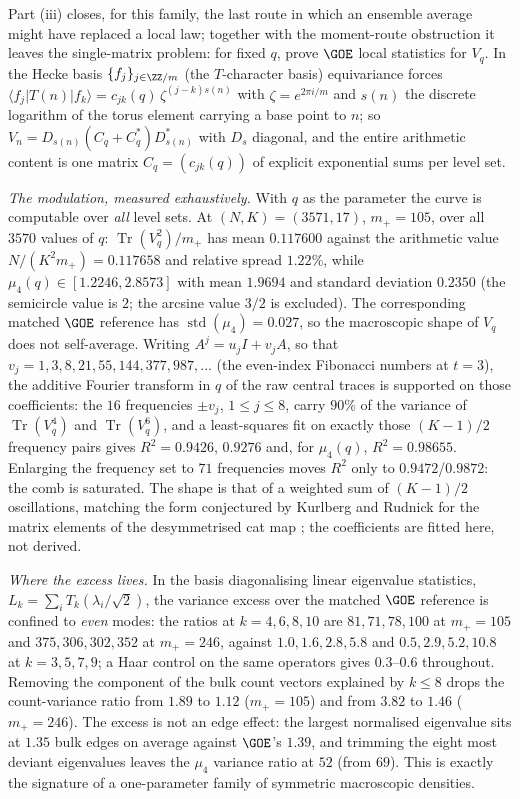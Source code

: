 Part \textup{(iii)} closes, for this family, the last route in which an
ensemble average might have replaced a local law; together with the
moment-route obstruction it leaves the single-matrix problem: for fixed $q$,
prove $\GOE$ local statistics for $V_q$.  In the Hecke basis $\{f_j\}_{j\in
\ZZ/m}$ (the $T$-character basis) equivariance forces
$\langle f_j|T(n)|f_k\rangle=c_{jk}(q)\,\zeta^{(j-k)s(n)}$ with
$\zeta=e^{2\pi i/m}$ and $s(n)$ the discrete logarithm of the torus element
carrying a base point to $n$; so
$V_n=D_{s(n)}(C_q+C_q^{*})D_{s(n)}^{*}$ with $D_s$ diagonal, and the entire
arithmetic content is one matrix $C_q=(c_{jk}(q))$ of explicit exponential
sums per level set.

\emph{The modulation, measured exhaustively.}  With $q$ as the parameter the
curve is computable over \emph{all} level sets.  At $(N,K)=(3571,17)$,
$m_+=105$, over all $3570$ values of $q$: $\operatorname{Tr}(V_q^2)/m_+$ has
mean $0.117600$ against the arithmetic value $N/(K^2m_+)=0.117658$ and
relative spread $1.22\%$, while
$\mu_4(q)\in[1.2246,2.8573]$ with mean $1.9694$ and standard deviation
$0.2350$ (the semicircle value is $2$; the arcsine value $3/2$ is excluded).
The corresponding matched $\GOE$ reference has $\operatorname{std}(\mu_4)
=0.027$, so the macroscopic shape of $V_q$ does not self-average.  Writing
$A^j=u_jI+v_jA$, so that $v_j=1,3,8,21,55,144,377,987,\dots$ (the even-index
Fibonacci numbers at $t=3$), the additive Fourier transform in $q$ of the raw
central traces is supported on those coefficients: the $16$ frequencies
$\pm v_j$, $1\le j\le 8$, carry $90\%$ of the variance of
$\operatorname{Tr}(V_q^4)$ and $\operatorname{Tr}(V_q^6)$, and a
least-squares fit on exactly those $(K-1)/2$ frequency pairs gives
$R^2=0.9426$, $0.9276$ and, for $\mu_4(q)$, $R^2=0.98655$.  Enlarging the
frequency set to $71$ frequencies moves $R^2$ only to $0.9472$/$0.9872$: the
comb is saturated.  The shape is that of a weighted sum of $(K-1)/2$
oscillations, matching the form conjectured by Kurlberg and Rudnick for the
matrix elements of the desymmetrised cat map \cite{KR2003}; the coefficients
are fitted here, not derived.

\emph{Where the excess lives.}  In the basis diagonalising linear eigenvalue
statistics, $L_k=\sum_iT_k(\lambda_i/\sqrt2)$, the variance excess over the
matched $\GOE$ reference is confined to \emph{even} modes: the ratios at
$k=4,6,8,10$ are $81,71,78,100$ at $m_+=105$ and $375,306,302,352$ at
$m_+=246$, against $1.0,1.6,2.8,5.8$ and $0.5,2.9,5.2,10.8$ at
$k=3,5,7,9$; a Haar control on the same operators gives $0.3$--$0.6$
throughout.  Removing the component of the bulk count vectors explained by
$k\le8$ drops the count-variance ratio from $1.89$ to $1.12$ ($m_+=105$) and
from $3.82$ to $1.46$ ($m_+=246$).  The excess is not an edge effect: the
largest normalised eigenvalue sits at $1.35$ bulk edges on average against
$\GOE$'s $1.39$, and trimming the eight most deviant eigenvalues leaves the
$\mu_4$ variance ratio at $52$ (from $69$).  This is exactly the signature of
a one-parameter family of symmetric macroscopic densities.
